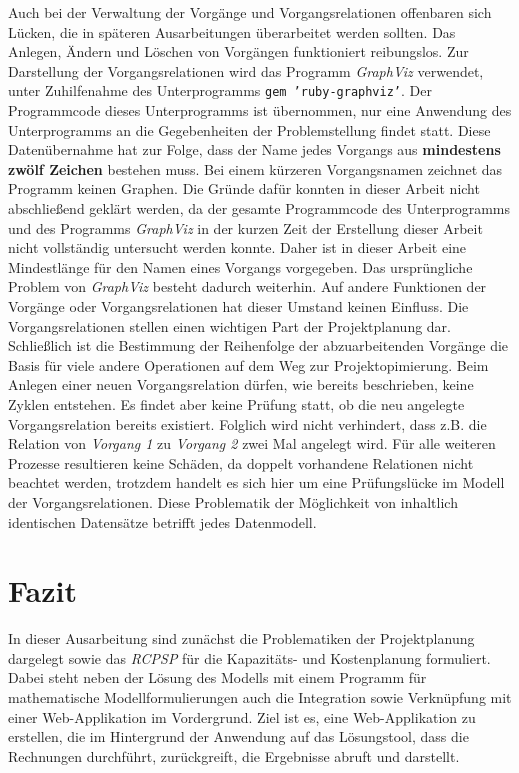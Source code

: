 \documentclass[a4paper,12pt,parskip,bibtotoc,liststotoc]{article}
\begin{document}
Auch bei der Verwaltung der Vorgänge und Vorgangsrelationen offenbaren sich Lücken, die in späteren Ausarbeitungen überarbeitet werden sollten. Das Anlegen, Ändern und Löschen von Vorgängen funktioniert reibungslos. Zur Darstellung der Vorgangsrelationen wird das Programm \textit{GraphViz} verwendet, unter Zuhilfenahme des Unterprogramms \texttt{gem 'ruby-graphviz'}. Der Programmcode dieses Unterprogramms ist übernommen, nur eine Anwendung des Unterprogramms an die Gegebenheiten der Problemstellung findet statt. Diese Datenübernahme hat zur Folge, dass der Name jedes Vorgangs aus \textbf{mindestens zwölf Zeichen} bestehen muss. Bei einem kürzeren Vorgangsnamen zeichnet das Programm keinen Graphen. Die Gründe dafür konnten in dieser Arbeit nicht abschließend geklärt werden, da der gesamte Programmcode des Unterprogramms und des Programms \textit{GraphViz} in der kurzen Zeit der Erstellung dieser Arbeit nicht vollständig untersucht werden konnte. Daher ist in dieser Arbeit eine Mindestlänge für den Namen eines Vorgangs vorgegeben. Das ursprüngliche Problem von \textit{GraphViz} besteht dadurch weiterhin. Auf andere Funktionen der Vorgänge oder Vorgangsrelationen hat dieser Umstand keinen Einfluss. Die Vorgangsrelationen stellen einen wichtigen Part der Projektplanung dar. Schließlich ist die Bestimmung der Reihenfolge der abzuarbeitenden Vorgänge die Basis für viele andere Operationen auf dem Weg zur Projektopimierung. Beim Anlegen einer neuen Vorgangsrelation dürfen, wie bereits beschrieben, keine Zyklen entstehen. Es findet aber keine Prüfung statt, ob die neu angelegte Vorgangsrelation bereits existiert. Folglich wird nicht verhindert, dass z.B. die Relation von \textit{Vorgang 1} zu \textit{Vorgang 2} zwei Mal angelegt wird. Für alle weiteren Prozesse resultieren keine Schäden, da doppelt vorhandene Relationen nicht beachtet werden, trotzdem handelt es sich hier um eine Prüfungslücke im Modell der Vorgangsrelationen. Diese Problematik der Möglichkeit von inhaltlich identischen Datensätze betrifft jedes Datenmodell.\\      
  
\section{Fazit} \label{Fazit}
In dieser Ausarbeitung sind zunächst die Problematiken der Projektplanung dargelegt sowie das \textit{RCPSP} für die Kapazitäts- und Kostenplanung formuliert. Dabei steht neben der Lösung des Modells mit einem Programm für mathematische Modellformulierungen auch die Integration sowie Verknüpfung mit einer Web-Applikation im Vordergrund. Ziel ist es, eine Web-Applikation zu erstellen, die im Hintergrund der Anwendung auf das Lösungstool, dass die Rechnungen durchführt, zurückgreift, die Ergebnisse abruft und darstellt.\\
\end{document}
